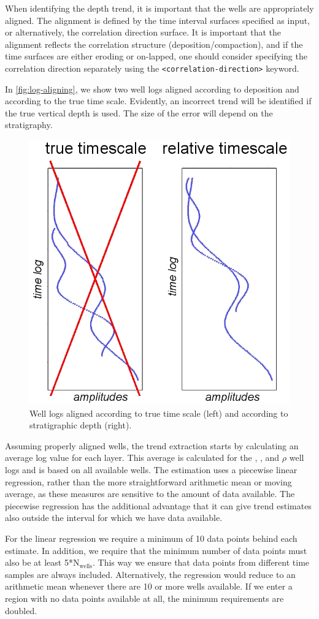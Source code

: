 When identifying the depth trend, it is important that the wells are
appropriately aligned. The alignment is defined by the time interval
surfaces specified as input, or alternatively, the correlation
direction surface. It is important that the alignment reflects the
correlation structure (deposition/compaction), and if the time
surfaces are either eroding or on-lapped, one should consider specifying
the correlation direction separately using the
\texttt{<correlation-direction>} keyword.

In \autoref{fig:log-aligning}, we show two well logs aligned according
to deposition and according to the true time scale. Evidently, an
incorrect trend will be identified if the true vertical depth is
used. The size of the error will depend on the stratigraphy.

\begin{figure}
\centering
\includegraphics[width=.45\linewidth]{images/implementation/Trend-analysis_dep-vs-comp}
\caption{Well logs aligned according to true time scale (left) and
         according to stratigraphic depth (right).}
\label{fig:log-aligning}
\end{figure}

Assuming properly aligned wells, the trend extraction starts by
calculating an average log value for each layer. This average is
calculated for the \vp, \vs, and $\rho$ well logs and is based on all
available wells. The estimation uses a piecewise linear regression,
rather than the more straightforward arithmetic mean or moving
average, as these measures are sensitive to the amount of data
available. The piecewise regression has the additional advantage
that it can give trend estimates also outside the interval for which
we have data available.

For the linear regression we require a minimum of 10 data points
behind each estimate. In addition, we require that the minimum number
of data points must also be at least 5*N$_\text{wells}$. This way we
ensure that data points from different time samples are always
included. Alternatively, the regression would reduce to an arithmetic
mean whenever there are 10 or more wells available. If we enter a region
with no data points available at all, the minimum requirements are
doubled.

